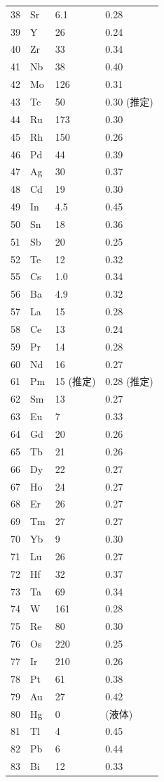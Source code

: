 \documentclass[11pt,a4paper]{article}
\theoremstyle{remark}
\begin{document}
\begin{longtable}{p{0.6cm}p{1.2cm}p{1.5cm}p{1.5cm}}
		38 & Sr & 6.1 & 0.28 \\
		39 & Y  & 26 & 0.24 \\
		40 & Zr & 33 & 0.34 \\
		41 & Nb & 38 & 0.40 \\
		42 & Mo & 126 & 0.31 \\
		43 & Tc & 50 & 0.30 (推定) \\
		44 & Ru & 173 & 0.30 \\
		45 & Rh & 150 & 0.26 \\
		46 & Pd & 44 & 0.39 \\
		47 & Ag & 30 & 0.37 \\
		48 & Cd & 19 & 0.30 \\
		49 & In & 4.5 & 0.45 \\
		50 & Sn & 18 & 0.36 \\
		51 & Sb & 20 & 0.25 \\
		52 & Te & 12 & 0.32 \\
		55 & Cs & 1.0 & 0.34 \\
		56 & Ba & 4.9 & 0.32 \\
		57 & La & 15 & 0.28 \\
		58 & Ce & 13 & 0.24 \\
		59 & Pr & 14 & 0.28 \\
		60 & Nd & 16 & 0.27 \\
		61 & Pm & 15 (推定) & 0.28 (推定) \\
		62 & Sm & 13 & 0.27 \\
		63 & Eu & 7 & 0.33 \\
		64 & Gd & 20 & 0.26 \\
		65 & Tb & 21 & 0.26 \\
		66 & Dy & 22 & 0.27 \\
		67 & Ho & 24 & 0.27 \\
		68 & Er & 26 & 0.27 \\
		69 & Tm & 27 & 0.27 \\
		70 & Yb & 9 & 0.30 \\
		71 & Lu & 26 & 0.27 \\
		72 & Hf & 32 & 0.37 \\
		73 & Ta & 69 & 0.34 \\
		74 & W  & 161 & 0.28 \\
		75 & Re & 80 & 0.30 \\
		76 & Os & 220 & 0.25 \\
		77 & Ir & 210 & 0.26 \\
		78 & Pt & 61 & 0.38 \\
		79 & Au & 27 & 0.42 \\
		80 & Hg & 0 & (液体) \\
		81 & Tl & 4 & 0.45 \\
		82 & Pb & 6 & 0.44 \\
		83 & Bi & 12 & 0.33 \\
		\bottomrule
	\end{longtable}
	
\end{document}
